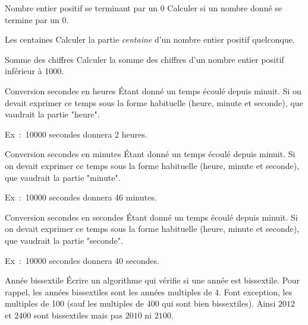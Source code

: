 \clearpage	
			\begin{Exercice}{Nombre entier positif se terminant par un 0}
				Calculer si un nombre donné se termine par un 0.
			\end{Exercice}
	
			\begin{Exercice}{Les centaines}
				Calculer la partie \emph{centaine}
				d'un nombre entier positif quelconque.
			\end{Exercice}
	
			\begin{Exercice}{Somme des chiffres}
				Calculer la somme des chiffres
				d’un nombre entier positif inférieur à 1000.
			\end{Exercice}
		
			\begin{Exercice}{Conversion secondes en heures}
				Étant donné un temps écoulé depuis minuit.
				Si on devait exprimer ce temps sous la forme
				habituelle (heure, minute et seconde),
				que vaudrait la partie "heure".
		
				Ex~:~10000 secondes donnera 2 heures.
			\end{Exercice}
		
			\begin{Exercice}{Conversion secondes en minutes}
				Étant donné un temps écoulé depuis minuit.
				Si on devait exprimer ce temps sous la forme
				habituelle (heure, minute et seconde),
				que vaudrait la partie "minute".
		
				Ex~:~10000 secondes donnera 46 minutes.
			\end{Exercice}
		
			\begin{Exercice}{Conversion secondes en secondes}
				Étant donné un temps écoulé depuis minuit.
				Si on devait exprimer ce temps sous la forme
				habituelle (heure, minute et seconde),
				que vaudrait la partie "seconde".
		
				Ex~:~10000 secondes donnera 40 secondes.
			\end{Exercice}	
		
			\begin{Exercice}{Année bissextile}
				Écrire un algorithme qui vérifie si une année est bissextile. 
				Pour rappel, les années bissextiles sont les années multiples de 4. 
				Font exception, les multiples de 100 
				(sauf les multiples de 400 qui sont bien bissextiles). 
				Ainsi $2012$ et $2400$ sont bissextiles mais pas $2010$ ni $2100$.
			\end{Exercice}
			 		 
